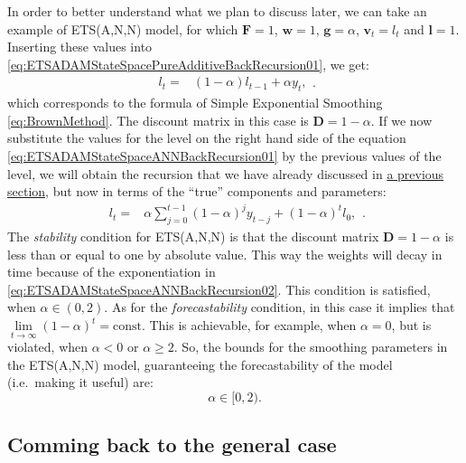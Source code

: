\documentclass[
]{book}
\theoremstyle{definition}
\theoremstyle{definition}
\theoremstyle{definition}
\theoremstyle{definition}
\theoremstyle{remark}
\begin{document}
In order to better understand what we plan to discuss later, we can take an example of ETS(A,N,N) model, for which \(\mathbf{F}=1\), \(\mathbf{w}=1\), \(\mathbf{g}=\alpha\), \(\mathbf{v}_t=l_t\) and \(\boldsymbol{l}=1\). Inserting these values into \eqref{eq:ETSADAMStateSpacePureAdditiveBackRecursion01}, we get:
\begin{equation}
  \begin{aligned}
    l_{t} = & \left(1 - \alpha \right) {l}_{t-1} + \alpha {y}_{t},
  \end{aligned}.
  \label{eq:ETSADAMStateSpaceANNBackRecursion01}
\end{equation}
which corresponds to the formula of Simple Exponential Smoothing \eqref{eq:BrownMethod}. The discount matrix in this case is \(\mathbf{D}=1-\alpha\). If we now substitute the values for the level on the right hand side of the equation \eqref{eq:ETSADAMStateSpaceANNBackRecursion01} by the previous values of the level, we will obtain the recursion that we have already discussed in \protect\hyperlink{whyExponential}{a previous section}, but now in terms of the ``true'' components and parameters:
\begin{equation}
  \begin{aligned}
    l_{t} = & {\alpha} \sum_{j=0}^{t-1} (1 -{\alpha})^j {y}_{t-j} + (1 -{\alpha})^t l_0,
  \end{aligned}.
  \label{eq:ETSADAMStateSpaceANNBackRecursion02}
\end{equation}
The \emph{stability} condition for ETS(A,N,N) is that the discount matrix \(\mathbf{D}=1-\alpha\) is less than or equal to one by absolute value. This way the weights will decay in time because of the exponentiation in \eqref{eq:ETSADAMStateSpaceANNBackRecursion02}. This condition is satisfied, when \(\alpha \in(0, 2)\). As for the \emph{forecastability} condition, in this case it implies that \(\lim\limits_{t\rightarrow\infty}(1 -{\alpha})^t = \text{const}\). This is achievable, for example, when \(\alpha=0\), but is violated, when \(\alpha<0\) or \(\alpha\geq 2\). So, the bounds for the smoothing parameters in the ETS(A,N,N) model, guaranteeing the forecastability of the model (i.e.~making it useful) are:
\begin{equation}
  \alpha \in [0, 2) .
  \label{eq:ETSADAMStateSpaceANNBounds}
\end{equation}

\hypertarget{comming-back-to-the-general-case}{%
\subsection{Comming back to the general case}\label{comming-back-to-the-general-case}}
\end{document}
